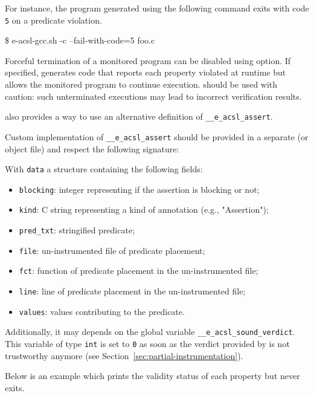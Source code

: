 For instance, the program generated using the following command
exits with code \texttt{5} on a predicate violation.
\begin{shell}
\$ e-acsl-gcc.sh -c --fail-with-code=5 foo.c
\end{shell}

Forceful termination of a monitored program can be disabled using
 option. If specified, \eacslgcc generates code that
reports each property violated at runtime but allows the monitored program to
continue execution.  should be used with caution:
such unterminated executions may lead to incorrect verification results.

\eacslgcc also provides a way to use an alternative definition of
\texttt{\_\_e\_acsl\_assert}.

Custom implementation of \texttt{\_\_e\_acsl\_assert}
should be provided in a separate \C (or object file) and respect the
following signature:


With \texttt{data} a structure containing the following fields:
\begin{itemize}
  \item \texttt{blocking}: integer representing if the assertion is blocking or
        not;
  \item \texttt{kind}: C string representing a kind of annotation (e.g.,
        "Assertion");
  \item \texttt{pred\_txt}: stringified predicate;
  \item \texttt{file}: un-instrumented file of predicate placement;
  \item \texttt{fct}: function of predicate placement in the un-instrumented
        file;
  \item \texttt{line}: line of predicate placement in the un-instrumented file;
  \item \texttt{values}: values contributing to the predicate.
\end{itemize}

Additionally, it may depends on the global variable
\texttt{\_\_e\_acsl\_sound\_verdict}. This
variable of type \texttt{int} is set to \texttt{0} as soon as the verdict
provided by \eacsl is not trustworthy anymore (see
Section~\ref{sec:partial-instrumentation}).

Below is an example which prints the validity status of each property but never
exits.


